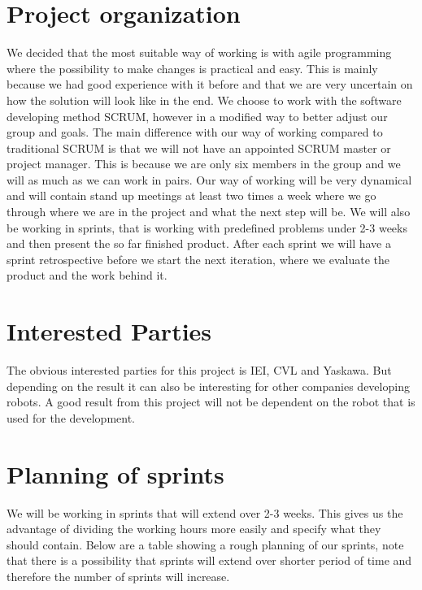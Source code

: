 \documentclass[10pt,a4paper]{article}
\begin{document}
\section{Project organization}
We decided that the most suitable way of working is with agile programming where the possibility to make changes is practical and easy. This is mainly because we had good experience with it before and that we are very uncertain on how the solution will look like in the end. We choose to work with the software developing method SCRUM, however in a modified way to better adjust our group and goals. The main difference with our way of working compared to traditional SCRUM is that we will not have an appointed SCRUM master or project manager. This is because we are only six members in the group and we will as much as we can work in pairs. Our way of working will be very dynamical and will contain stand up meetings at least two times a week where we go through where we are in the project and what the next step will be. We will also be working in sprints, that is working with predefined problems under 2-3 weeks and then present the so far finished product. After each sprint we will have a sprint retrospective before we start the next iteration, where we evaluate the product and the work behind it.

\section{Interested Parties}
The obvious interested parties for this project is IEI, CVL and Yaskawa. But depending on the result it can also be interesting for other companies developing robots. A good result from this project will not be dependent on the robot that is used for the development.

\section{Planning of sprints}
We will be working in sprints that will extend over 2-3 weeks. This gives us the advantage of dividing the working hours more easily and specify what they should contain. Below are a table showing a rough planning of our sprints, note that there is a possibility that sprints will extend over shorter period of time and therefore the number of sprints will increase.
\end{document}
